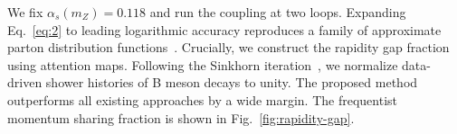 We fix $\alpha_s(m_Z) = 0.118$ and run the coupling at two loops.
Expanding Eq.~\eqref{eq:2} to leading logarithmic accuracy reproduces a
family of approximate parton distribution
functions~\cite{TPC:0611-ANGLE-All-Order-Normalized-Generative-Lorentz-Invariant-Embeddings-September-22-2026}.
Crucially, we construct the rapidity gap fraction using attention maps.
Following the Sinkhorn
iteration~\cite{TPC:0764-Are-Infrared-Poles-Universal-September-21-2026},
we normalize data-driven shower histories of B meson decays to unity.
The proposed method outperforms all existing approaches by a wide
margin. The frequentist momentum sharing fraction is shown in
Fig.~\ref{fig:rapidity-gap}.

